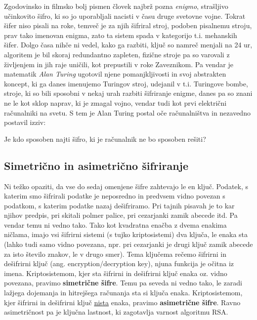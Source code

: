 \documentclass[a4paper, 12pt]{article} %
\begin{document}
Zgodovinsko in filmsko bolj pismen človek najbrž pozna \emph{enigmo}, strašljivo učinkovito šifro, ki so jo uporabljali nacisti v času druge svetovne vojne. Tokrat šifer niso pisali na roke, temveč je za njih šifriral stroj, podoben pisalnemu stroju, prav tako imenovan enigma, zato ta sistem spada v kategorijo t.i. mehanskih šifer. Dolgo časa nihče ni vedel, kako ga razbiti, ključ so namreč menjali na 24 ur, algoritem je bil skoraj redundantno zapleten, fizične stroje pa so varovali z življenjem in jih raje uničili, kot prepustili v roke Zaveznikom. Pa vendar je matematik \emph{Alan Turing} ugotovil njene pomanjkljivosti in svoj abstrakten koncept, ki ga danes imenujemo Turingov stroj, udejanil v t.i. Turingove bombe, stroje, ki so bili sposobni v nekaj urah razbiti šifriranje enigme, danes pa so znani ne le kot sklop naprav, ki je zmagal vojno, vendar tudi kot prvi električni računalniki na svetu. S tem je Alan Turing postal oče računalništva in nezavedno postavil izziv:

Je kdo sposoben najti šifro, ki je računalnik ne bo sposoben rešiti?

\subsection{Simetrično in asimetrično šifriranje}

Ni težko opaziti, da vse do sedaj omenjene šifre zahtevajo le en ključ. Podatek, s katerim smo šifrirali podatke je neposredno in predvsem vidno povezan s podatkom, s katerim podatke nazaj dešifriramo. Pri tajnih pisavah je to kar njihov predpis, pri skitali polmer palice, pri cezarjanki zamik abecede itd. Pa vendar temu ni vedno tako. Tako kot kvadratna enačba z dvema enakima ničlama, imajo vsi šifrirni sistemi (s tujko kriptosistemi) dva ključa, le enaka sta (lahko tudi samo vidno povezana, npr. pri cezarjanki je drugi ključ zamik abecede za isto število znakov, le v drugo smer). Tema ključema rečemo šifrirni in dešifrirni ključ (ang. encryption/decryption key), njuna funkcija je očitna iz imena.
\newline
\newline
Kriptosistemom, kjer sta šifrirni in dešifrirni ključ enaka oz. vidno povezana, pravimo \textbf{simetrične šifre}. Temu pa seveda ni vedno tako, le zaradi lažjega dojemanja in hitrejšega računanja sta si ključa enaka. Kriptosistemom, kjer šifrirni in dešifrirni ključ \underline{nista} enaka, pravimo \textbf{asimetrične šifre}. Ravno asimetričnost pa je ključna lastnost, ki zagotavlja varnost algoritmu RSA.
\end{document}
